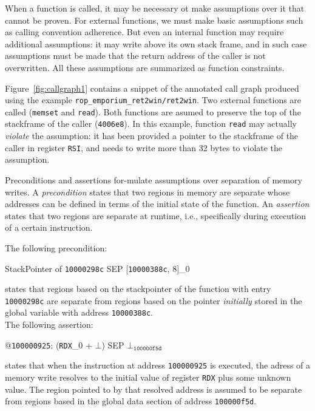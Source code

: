\documentclass[12pt,a4paper]{article}
\newcounter{example}
\begin{document}
{\begin{description}[style=unboxed,leftmargin=0cm,noitemsep,nosep]
\item[FUNCTION CONSTRAINTS.] 
When a function is called, it may be necessary ot make assumptions over it that cannot be proven.
For external functions, we must make basic assumptions such as calling convention adherence.
But even an internal function may require additional assumptions: it may write above its own stack frame, and in such case assumptions must be made that the return address of the caller is not overwritten.
All these assumptions are summarized as function constraints.
\end{description}
\begin{example}
Figure~\ref{fig:callgraph1} contains a snippet of the annotated call graph produced using the example \texttt{rop\_emporium\_ret2win/ret2win}.
Two external functions are called (\texttt{memset} and \texttt{read}).
Both functions are asumed to preserve the top of the stackframe of the caller (\texttt{4006e8}).
In this example, function \texttt{read} may actually \emph{violate} the assumption: it has been provided a pointer to the stackframe of the caller in register \texttt{RSI}, and needs to write more than 32 bytes to violate the assumption.
\end{example}


\begin{description}[style=unboxed,leftmargin=0cm,noitemsep,nosep]
\item[PRECONDITIONS AND ASSERTIONS.] 
Preconditions and assertions for-mulate assumptions over separation of memory writes.
A \emph{precondition} states that two regions in memory are separate whose addresses can be defined in terms of the initial state of the function.
An \emph{assertion} states that two regions are separate at runtime, i.e., specifically during execution of a certain instruction.
\end{description}
\begin{example}
The following precondition:
\begin{center}
StackPointer of \texttt{10000298c} SEP [\texttt{10000388c}, 8]\_0
\end{center}
states that regions based on the stackpointer of the function with entry \texttt{10000298c} are separate from regions based on the pointer \emph{initially} stored in the global variable with address \texttt{10000388c}.
\\
The following assertion:
\begin{center}
@\texttt{100000925}: (\texttt{RDX}\_0 + $\bot$) SEP $\bot_{\mathtt{100000f5d}}$
\end{center}
states that when the instruction at address \texttt{100000925} is executed, the adress of a memory write resolves to the initial value of register \texttt{RDX} plus some unknown value.
The region pointed to by that resolved address is assumed to be separate from regions based in the global data section of address \texttt{100000f5d}.
\end{example}

}
\end{document}
